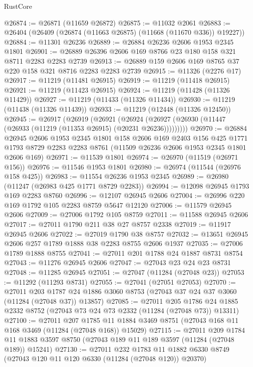 \begin{lexlean}{RustCore}
\begin{coremodule}
@26874 := @26871 (@11659 @26872)
@26875 := @11032 @2061
@26883 := @26404 (@26409 (@26874 (@11663 @26875) (@11668 (@11670 @336)) @19227))
@26884 := @11301 @26236
@26889 := @26884 @26236 @2606 @1953 @2345 @1801
@26901 := @26889 @26396 @2606 @169 @8766 @23 @180 @158 @321 @8711 @2283 @2283 @2739
@26913 := @26889 @159 @2606 @169 @8765 @37 @220 @158 @321 @8716 @2283 @2283 @2739
@26915 := @11326 (@2276 @17)
@26917 := @11219 (@11481 @26915)
@26919 := @11219 (@11418 @26915)
@26921 := @11219 (@11423 @26915)
@26924 := @11219 (@11428 (@11326 @11429))
@26927 := @11219 (@11433 (@11326 @11434))
@26930 := @11219 (@11438 (@11326 @11439))
@26933 := @11219 (@12448 (@11326 @12450))
@26945 := @26917
    (@26919
      (@26921
        (@26924 (@26927 (@26930 (@11447 (@26933 (@11219 (@11353 @26915) (@20231 @26236)))))))))
@26970 := @26884
    @26945
    @2606
    @1953
    @2345
    @1801
    @158
    @2606
    @169
    @2403
    @156
    @425
    @1771
    @1793
    @8729
    @2283
    @2283
    @8761
    (@11509 @26236 @2606 @1953 @2345 @1801 @2606 @169)
@26971 := @11539 @1801
@26974 := @26970 (@11519 (@26971 @156))
@26976 := @11546 @1953 @1801
@26980 := @26974 (@11544 (@26976 @158 @425))
@26983 := @11554 @26236 @1953 @2345
@26989 := @26980 (@11247 (@26983 @425 @1771 @8729 @2283))
@26994 := @12098 @26945 @1793 @169 @2283 @8760
@26996 := @12107 @26945 @2606
@27004 := @26996 @220 @169 @1792 @105 @2283 @8759 @5647 @12120
@27006 := @11579 @26945 @2606
@27009 := @27006 @1792 @105 @8759
@27011 := @11588 @26945 @2606
@27017 := @27011 @1790 @211 @38 @27 @8757 @2338
@27019 := @11917 @26945 @2606
@27022 := @27019 @1790 @38 @8757
@27032 := @13651 @26945 @2606 @257 @1789 @1888 @38 @2283 @8755 @2606 @1937
@27035 := @27006 @1789 @1888 @8755
@27041 := @27011 @201 @1788 @24 @1887 @8731 @8754
@27043 := @11276 @26945 @2606
@27047 := @27043 @23 @24 @23 @8731
@27048 := @11285 @26945
@27051 := @27047 (@11284 (@27048 @23))
@27053 := @11292 (@11293 @8731)
@27055 := @27041 (@27051 @27053)
@27070 := @27011
    @203
    @1787
    @24
    @1886
    @3060
    @8753
    (@27043 @37 @24 @37 @3060 (@11284 (@27048 @37)) @13857)
@27085 := @27011
    @205
    @1786
    @24
    @1885
    @2332
    @8752
    (@27043 @73 @24 @73 @2332 (@11284 (@27048 @73)) @13311)
@27100 := @27011
    @207
    @1785
    @11
    @1884
    @3469
    @8751
    (@27043 @168 @11 @168 @3469 (@11284 (@27048 @168)) @15029)
@27115 := @27011
    @209
    @1784
    @11
    @1883
    @3597
    @8750
    (@27043 @189 @11 @189 @3597 (@11284 (@27048 @189)) @15241)
@27130 := @27011
    @232
    @1783
    @11
    @1882
    @6330
    @8749
    (@27043 @120 @11 @120 @6330 (@11284 (@27048 @120)) @20370)

\end{coremodule}
\end{lexlean}

